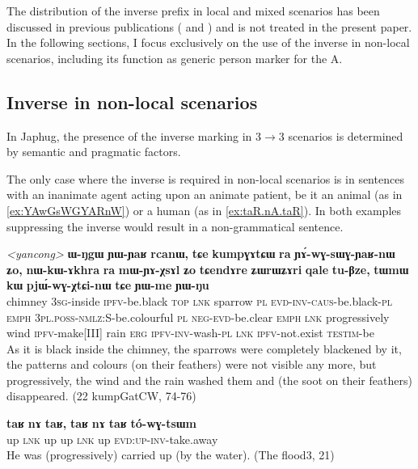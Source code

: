 \documentclass[oneside,a4paper,11pt]{article}
\newcommand{\ipa}[1]{\textbf{\phon\mbox{#1}}} %
\begin{document}
The distribution of the inverse prefix in local and mixed scenarios has been discussed in previous publications (\citealt{jacques10inverse} and \citealt{jacques14inverse}) and is not treated in the present paper. In the following sections, I focus exclusively on the use of the inverse in non-local scenarios, including its function as generic person marker for the A.

\subsection{Inverse in non-local scenarios} \label{sec:obv.jpg}
In Japhug, the presence of the inverse marking in  3$\rightarrow$3 scenarios is determined by semantic and pragmatic factors. 

The only case where the inverse is required in non-local scenarios is in sentences with an inanimate agent acting upon an animate patient, be it an animal (as in \ref{ex:YAwGsWGYARnW}) or a human (as in \ref{ex:taR.nA.taR}). In both examples suppressing the inverse would result in a non-grammatical sentence.  
 

 \begin{exe}
\ex \label{ex:YAwGsWGYARnW} 
\gll
\textit{<yancong>}	\ipa{ɯ-ŋgɯ} 	\ipa{ɲɯ-ɲaʁ} 	\ipa{rcanɯ,} 	\ipa{tɕe} 	\ipa{kumpɣɤtɕɯ} 	\ipa{ra} 	\ipa{ɲɤ́-wɣ-sɯɣ-ɲaʁ-nɯ} 	\ipa{ʑo,} 	\ipa{nɯ-kɯ-ɤkhra} 	\ipa{ra} 	\ipa{mɯ-ɲɤ-χsɤl} 	\ipa{ʑo} 	\ipa{tɕendɤre} 	\ipa{ʑɯrɯʑɤri} 	\ipa{qale} 	\ipa{tu-βze,} 	\ipa{tɯmɯ} 	\ipa{kɯ} 	\ipa{pjɯ́-wɣ-χtɕi-nɯ} 	\ipa{tɕe} 	\ipa{ɲɯ-me} 	\ipa{ɲɯ-ŋu} \\
chimney \textsc{3sg}-inside \textsc{ipfv}-be.black \textsc{top} \textsc{lnk} sparrow \textsc{pl} \textsc{evd-inv-caus}-be.black-\textsc{pl} \textsc{emph} \textsc{3pl.poss-nmlz}:S-be.colourful \textsc{pl} \textsc{neg-evd}-be.clear \textsc{emph} \textsc{lnk} progressively wind \textsc{ipfv}-make[III] rain \textsc{erg} \textsc{ipfv-inv}-wash-\textsc{pl} \textsc{lnk} \textsc{ipfv}-not.exist \textsc{testim}-be \\
\glt As it is black inside the chimney, the sparrows were completely blackened by it, the patterns and colours (on their feathers) were not visible any more, but progressively, the wind and the rain washed them and (the soot on their feathers) disappeared.
 (22 kumpGatCW, 74-76)
\end{exe}

 \begin{exe}
\ex \label{ex:taR.nA.taR} 
\gll
\ipa{taʁ}   	\ipa{nɤ}   	\ipa{taʁ,}   	\ipa{taʁ}   	\ipa{nɤ}   	\ipa{taʁ}   	\ipa{tó-wɣ-tsɯm}   \\
up \textsc{lnk} up up \textsc{lnk} up \textsc{evd:up-inv-}take.away \\
\glt He was (progressively)  carried up (by the water). (The flood3, 21)
\end{exe}
\end{document}
